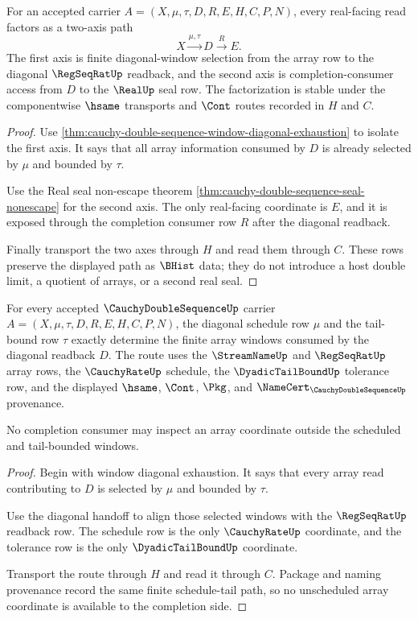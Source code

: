 \begin{theorem}\label{thm:cauchy-double-sequence-two-axis-seal-factorization}
For an accepted carrier $A=(X,\mu,\tau,D,R,E,H,C,P,N)$, every real-facing read factors as a two-axis path
$$
X \xrightarrow{\mu,\tau} D \xrightarrow{R} E.
$$
The first axis is finite diagonal-window selection from the array row to the diagonal $\RegSeqRatUp$ readback, and the second axis is completion-consumer access from $D$ to the $\RealUp$ seal row. The factorization is stable under the componentwise $\hsame$ transports and $\Cont$ routes recorded in $H$ and $C$.
\end{theorem}
\begin{proof}
Use \autoref{thm:cauchy-double-sequence-window-diagonal-exhaustion} to isolate the first axis. It says that all array information consumed by $D$ is already selected by $\mu$ and bounded by $\tau$.

Use the Real seal non-escape theorem \autoref{thm:cauchy-double-sequence-seal-nonescape} for the second axis. The only real-facing coordinate is $E$, and it is exposed through the completion consumer row $R$ after the diagonal readback.

Finally transport the two axes through $H$ and read them through $C$. These rows preserve the displayed path as $\BHist$ data; they do not introduce a host double limit, a quotient of arrays, or a second real seal.
\end{proof}

\begin{theorem}
\label{thm:cauchy-double-sequence-schedule-tail-exactness}
For every accepted $\CauchyDoubleSequenceUp$ carrier $A=(X,\mu,\tau,D,R,E,H,C,P,N)$, the diagonal schedule row $\mu$ and the tail-bound row $\tau$ exactly determine the finite array windows consumed by the diagonal readback $D$. The route uses the $\StreamNameUp$ and $\RegSeqRatUp$ array rows, the $\CauchyRateUp$ schedule, the $\DyadicTailBoundUp$ tolerance row, and the displayed $\hsame$, $\Cont$, $\Pkg$, and $\NameCert_{\CauchyDoubleSequenceUp}$ provenance.

No completion consumer may inspect an array coordinate outside the scheduled and tail-bounded windows.
\end{theorem}
\begin{proof}
Begin with window diagonal exhaustion. It says that every array read contributing to $D$ is selected by $\mu$ and bounded by $\tau$.

Use the diagonal handoff to align those selected windows with the $\RegSeqRatUp$ readback row. The schedule row is the only $\CauchyRateUp$ coordinate, and the tolerance row is the only $\DyadicTailBoundUp$ coordinate.

Transport the route through $H$ and read it through $C$. Package and naming provenance record the same finite schedule-tail path, so no unscheduled array coordinate is available to the completion side.
\end{proof}

